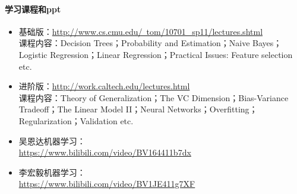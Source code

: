\documentclass[lang=cn,11pt,a4paper]{elegant_template}
\begin{document}
\paragraph{学习课程和ppt}
\begin{itemize}
    \item 基础版：\href{http://www.cs.cmu.edu/~tom/10701_sp11/lectures.shtml}{http://www.cs.cmu.edu/~tom/10701\_sp11/lectures.shtml} \\
课程内容：Decision Trees；Probability and Estimation；Naive Bayes；Logistic Regression；Linear Regression；Practical Issues: Feature selection etc.
    \item 进阶版：\href{http://work.caltech.edu/lectures.html}{http://work.caltech.edu/lectures.html} \\
课程内容：Theory of Generalization；The VC Dimension；Bias-Variance Tradeoff；The Linear Model II；Neural Networks；Overfitting；Regularization；Validation etc.
    \item 吴恩达机器学习：\\ \href{https://www.bilibili.com/video/BV164411b7dx}{https://www.bilibili.com/video/BV164411b7dx}
    \item 李宏毅机器学习：\\
    \href{https://www.bilibili.com/video/BV1JE411g7XF}{https://www.bilibili.com/video/BV1JE411g7XF}
\end{itemize}
\end{document}
